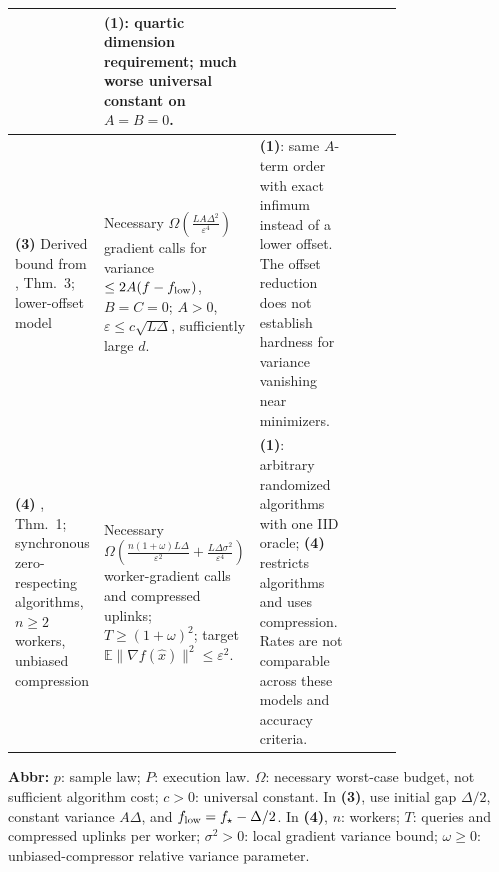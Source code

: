 \begin{table}[tp]
\begin{threeparttable}
\begin{tabularx}{\linewidth}{@{}>{\raggedright\arraybackslash}p{0.20\linewidth}>{\raggedright\arraybackslash}p{0.32\linewidth}>{\raggedright\arraybackslash}p{0.25\linewidth}>{\raggedright\arraybackslash}X@{}}
& \textbf{(1)}: quartic dimension requirement; much worse universal constant on $A=B=0$. \\
\midrule
\textbf{(3)} Derived bound from \citep{hdabcArjevaniV2}, Thm.~3; lower-offset model
& Necessary $\displaystyle\Omega\!\left(\frac{LA\Delta^2}{\varepsilon^4}\right)$ gradient calls for variance $\le2A(f-f_{\rm low})$, $B=C=0$; $A>0$, $\varepsilon\le c\sqrt{L\Delta}$, sufficiently large $d$.
& \textbf{(1)}: same $A$-term order with exact infimum instead of a lower offset. The offset reduction does not establish hardness for variance vanishing near minimizers.
& \\
\midrule
\textbf{(4)} \citep{hdabcHuangV2}, Thm.~1; synchronous zero-respecting algorithms, $n\ge2$ workers, unbiased compression
& Necessary $\displaystyle\Omega\!\left(\frac{n(1+\omega)L\Delta}{\varepsilon^2}+\frac{L\Delta\sigma^2}{\varepsilon^4}\right)$ worker-gradient calls and compressed uplinks; $T\ge(1+\omega)^2$; target $\mathbb E\|\nabla f(\hat x)\|^2\le\varepsilon^2$.
& \textbf{(1)}: arbitrary randomized algorithms with one IID oracle; \textbf{(4)} restricts algorithms and uses compression. Rates are not comparable across these models and accuracy criteria.
& \\
\bottomrule
\end{tabularx}
\begin{tablenotes}[flushleft]\footnotesize
\item[] \textbf{Abbr:} $p$: sample law; $P$: execution law. $\Omega$: necessary worst-case budget, not sufficient algorithm cost; $c>0$: universal constant. In \textbf{(3)}, use initial gap $\Delta/2$, constant variance $A\Delta$, and $f_{\rm low}=f_\star-\Delta/2$. In \textbf{(4)}, $n$: workers; $T$: queries and compressed uplinks per worker; $\sigma^2>0$: local gradient variance bound; $\omega\ge0$: unbiased-compressor relative variance parameter.
\end{tablenotes}
\end{threeparttable}
\end{table}
\clearpage
